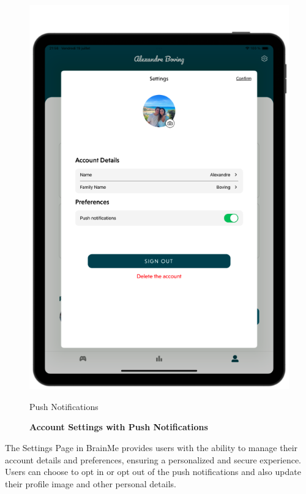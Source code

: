 \begin{figure}[H]
\begin{minipage}[b]{0.43\linewidth}
        \includegraphics[width=\linewidth]{TabletUI/Push Notifications.png}
        \caption{Push Notifications}
    \end{minipage}
    \vspace{0.5cm}
    \caption{\textbf{Account Settings with Push Notifications}}
\end{figure}

The Settings Page in BrainMe provides users with the ability to manage their account details and preferences, ensuring a personalized and secure experience. Users can choose to opt in or opt out of the push notifications and also update their profile image and other personal details.